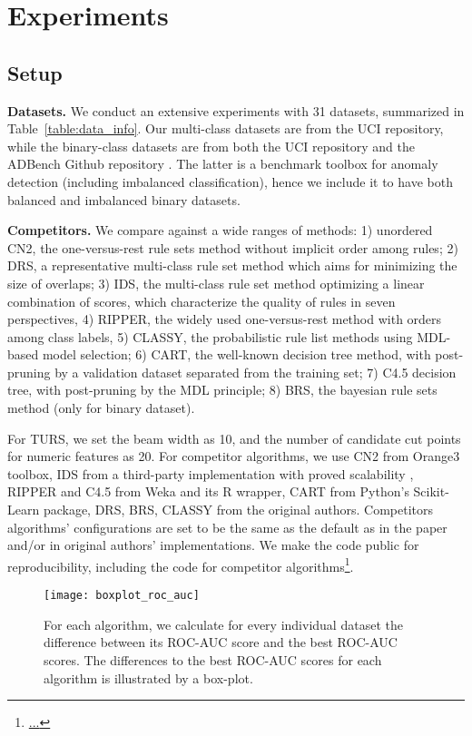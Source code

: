  
\section{Experiments} \label{sec:exp}
\subsection{Setup}
\textbf{Datasets.} We conduct an extensive experiments with 31 datasets, summarized in Table~\ref{table:data_info}. Our multi-class datasets are from the UCI repository, while the binary-class datasets are from both the UCI repository and the ADBench Github repository \citep{han2022adbench}. The latter is a benchmark toolbox for anomaly detection (including imbalanced classification), hence we include it to have both balanced and imbalanced binary datasets.

\noindent
\textbf{Competitors.} We compare against a wide ranges of methods: 1) unordered CN2, the one-versus-rest rule sets method without implicit order among rules; 2) DRS, a representative multi-class rule set method which aims for minimizing the size of overlaps; 3) IDS, the multi-class rule set method optimizing a linear combination of scores, which characterize the quality of rules in seven perspectives, 4) RIPPER, the widely used one-versus-rest method with orders among class labels, 5) CLASSY, the probabilistic rule list methods using MDL-based model selection; 6) CART, the well-known decision tree method, with post-pruning by a validation dataset separated from the training set; 7) C4.5 decision tree, with post-pruning by the MDL principle; 8) BRS, the bayesian rule sets method (only for binary dataset). 

 For TURS, we set the beam width as 10, and the number of candidate cut points for numeric features as 20. For competitor algorithms, we use CN2 from Orange3 toolbox, IDS from a third-party implementation with proved scalability \citep{filip2019pyids}, RIPPER and C4.5 from Weka and its R wrapper, CART from Python's Scikit-Learn package, DRS, BRS, CLASSY from the original authors. Competitors algorithms' configurations are set to be the same as the default as in the paper and/or in original authors' implementations. We make the code public for reproducibility, including the code for competitor algorithms\footnote{\url{...}}.




\begin{figure}[ht]
\texttt{[image: boxplot\_roc\_auc]}	
\caption{For each algorithm, we calculate for every individual dataset the difference between its ROC-AUC score and the best ROC-AUC scores. The differences to the best ROC-AUC scores for each algorithm is illustrated by a box-plot.} \label{fig:diff_to_best_auc}
\end{figure}

